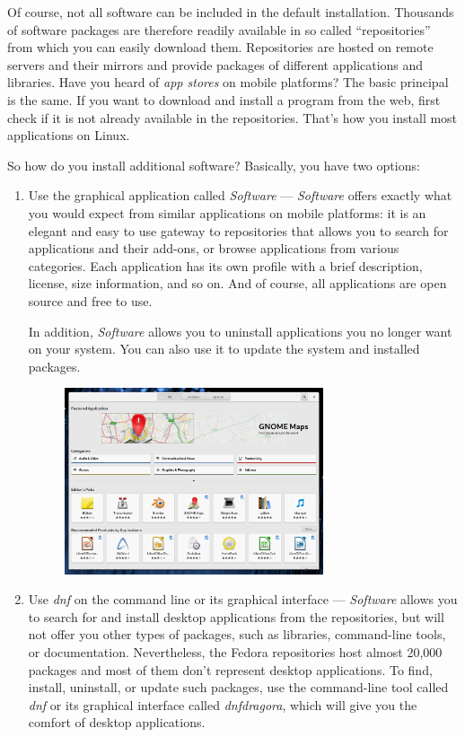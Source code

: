 Of course, not all software can be included in the default installation. Thousands of software packages are therefore readily available in so called \enquote{repositories} from which you can easily download them. Repositories are hosted on remote servers and their mirrors and provide packages of different applications and libraries. Have you heard of \emph{app stores} on mobile platforms? The basic principal is the same. If you want to download and install a program from the web, first check if it is not already available in the repositories. That's how you install most applications on Linux.


So how do you install additional software? Basically, you have two options:
\begin{enumerate}
\item Use the graphical application called \emph{Software} --- \emph{Software} offers exactly what you would expect from similar applications on mobile platforms: it is an elegant and easy to use gateway to repositories that allows you to search for applications and their add-ons, or browse applications from various categories. Each application has its own profile with a brief description, license, size information, and so on. And of course, all applications are open source and free to use.

In addition, \emph{Software} allows you to uninstall applications you no longer want on your system. You can also use it to update the system and installed packages.

\begin{figure}[htbp]
\begin{center}
\includegraphics[width=0.72\textwidth]{img/software}
 \label{fig:software}
\end{center}
\end{figure}

\item Use \emph{dnf} on the command line or its graphical interface  --- \emph{Software} allows you to search for and install desktop applications from the repositories, but will not offer you other types of packages, such as libraries, command-line tools, or documentation. Nevertheless, the Fedora repositories host almost 20,000 packages and most of them don't represent desktop applications. To find, install, uninstall, or update such packages, use the command-line tool called \emph{dnf} or its graphical interface called \emph{dnfdragora}, which will give you the comfort of desktop applications.
\end{enumerate}

